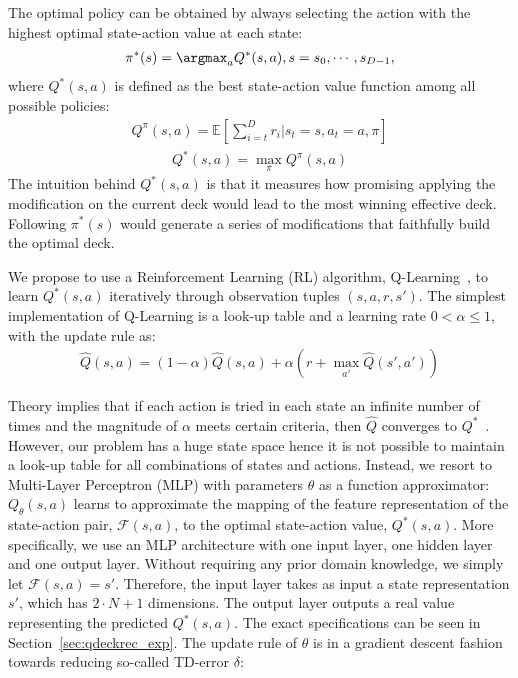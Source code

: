 The optimal policy can be obtained by always selecting the action with the highest optimal state-action value at each state:
\begin{align}
    \pi^*(s) = \argmax_a Q^*(s,a),  s = s_0, \cdots, s_{D-1},
\label{eqn:optpolicy}
\end{align}
where $Q^*(s,a)$ is defined as the best state-action value function among all possible policies:
\begin{align}
Q^\pi(s,a)=\mathbb{E}[\sum_{i=t}^{D} r_i | s_t=s, a_t=a, \pi] 
\end{align}
\begin{align}
Q^*(s,a)=\max_\pi Q^\pi(s,a) 
\end{align}
The intuition behind $Q^*(s,a)$ is that it measures how promising applying the modification on the current deck would lead to the most winning effective deck. Following $\pi^*(s)$ would generate a series of modifications that faithfully build the optimal deck. 

We propose to use a Reinforcement Learning (RL) algorithm, Q-Learning~\cite{watkins1992q}, to learn $Q^*(s,a)$ iteratively through observation tuples $(s,a,r,s')$. The simplest implementation of Q-Learning is a look-up table and a learning rate $0 < \alpha \leq 1$, with the update rule as: 
\begin{align}
\hat{Q}(s,a) = (1 - \alpha) \hat{Q}(s,a) + \alpha (r + \max_{a'} \hat{Q}(s', a')) 
\label{eqn:qsa}
\end{align}

Theory implies that if each action is tried in each state an infinite number of times and the magnitude of $\alpha$ meets certain criteria, then $\hat{Q}$ converges to $Q^*$~\cite{bertsekas1989parallel}. However, our problem has a huge state space hence it is not possible to maintain a look-up table for all combinations of states and actions. Instead, we resort to Multi-Layer Perceptron (MLP) with parameters $\theta$ as a function approximator: $Q_\theta(s,a)$ learns to approximate the mapping of the feature representation of the state-action pair, $\mathcal{F}(s,a)$, to the optimal state-action value, $Q^*(s,a)$. More specifically, we use an MLP architecture with one input layer, one hidden layer and one output layer. Without requiring any prior domain knowledge, we simply let $\mathcal{F}(s,a)=s'$. Therefore, the input layer takes as input a state representation $s'$, which has ${2\cdot N+1}$ dimensions. The output layer outputs a real value  representing the predicted $Q^*(s,a)$. The exact specifications can be seen in Section~\ref{sec:qdeckrec_exp}. The update rule of $\theta$ is in a gradient descent fashion towards reducing so-called TD-error $\delta$:

